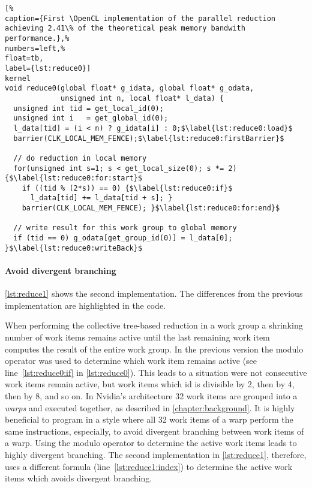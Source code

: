 \begin{lstlisting}[%                                                             
caption={First \OpenCL implementation of the parallel reduction achieving 2.41\% of the theoretical peak memory bandwith performance.},%
numbers=left,%
float=tb,
label={lst:reduce0}]
kernel
void reduce0(global float* g_idata, global float* g_odata,
             unsigned int n, local float* l_data) {
  unsigned int tid = get_local_id(0);
  unsigned int i   = get_global_id(0);
  l_data[tid] = (i < n) ? g_idata[i] : 0;$\label{lst:reduce0:load}$
  barrier(CLK_LOCAL_MEM_FENCE);$\label{lst:reduce0:firstBarrier}$

  // do reduction in local memory
  for(unsigned int s=1; s < get_local_size(0); s *= 2) {$\label{lst:reduce0:for:start}$
    if ((tid % (2*s)) == 0) {$\label{lst:reduce0:if}$
      l_data[tid] += l_data[tid + s]; }
    barrier(CLK_LOCAL_MEM_FENCE); }$\label{lst:reduce0:for:end}$

  // write result for this work group to global memory
  if (tid == 0) g_odata[get_group_id(0)] = l_data[0]; }$\label{lst:reduce0:writeBack}$
\end{lstlisting}

\FloatBarrier
\newpage

\paragraph{Avoid divergent branching}

\autoref{lst:reduce1} shows the second implementation.
The differences from the previous implementation are highlighted in the code.

When performing the collective tree-based reduction in a work group a shrinking number of work items remains active until the last remaining work item computes the result of the entire work group.
In the previous version the modulo operator was used to determine which work item remains active (see line~\ref{lst:reduce0:if} in \autoref{lst:reduce0}).
This leads to a situation were not consecutive work items remain active, but work items which id is divisible by 2, then by 4, then by 8, and so on.
In Nvidia's \GPU architecture 32 work items are grouped into a \emph{warps} and executed together, as described in \autoref{chapter:background}.
It is highly beneficial to program in a style where all 32 work items of a warp perform the same instructions, especially, to avoid divergent branching between work items of a warp.
Using the modulo operator to determine the active work items leads to highly divergent branching.
The second implementation in \autoref{lst:reduce1}, therefore, uses a different formula (line~\ref{lst:reduce1:index}) to determine the active work items which avoids divergent branching.

